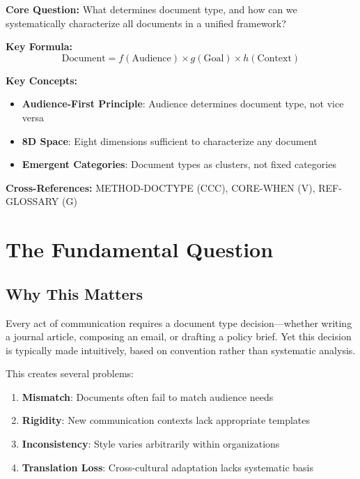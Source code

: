 \begin{tcolorbox}[colback=blue!5!white, colframe=blue!75!black,
    title=Quick Reference: 8D Document Type Theory]

\textbf{Core Question:} What determines document type, and how can we
systematically characterize all documents in a unified framework?

\textbf{Key Formula:}
\begin{equation}
\text{Document} = f(\text{Audience}) \times g(\text{Goal}) \times h(\text{Context})
\end{equation}

\textbf{Key Concepts:}
\begin{itemize}[nosep]
\item \textbf{Audience-First Principle}: Audience determines document type, not vice versa
\item \textbf{8D Space}: Eight dimensions sufficient to characterize any document
\item \textbf{Emergent Categories}: Document types as clusters, not fixed categories
\end{itemize}

\textbf{Cross-References:} METHOD-DOCTYPE (CCC), CORE-WHEN (V), REF-GLOSSARY (G)
\end{tcolorbox}


\section{The Fundamental Question}
\label{sec:doctype-theory-fundamental}

\subsection{Why This Matters}

Every act of communication requires a document type decision---whether writing
a journal article, composing an email, or drafting a policy brief. Yet this
decision is typically made intuitively, based on convention rather than
systematic analysis.

This creates several problems:

\begin{enumerate}
\item \textbf{Mismatch}: Documents often fail to match audience needs
\item \textbf{Rigidity}: New communication contexts lack appropriate templates
\item \textbf{Inconsistency}: Style varies arbitrarily within organizations
\item \textbf{Translation Loss}: Cross-cultural adaptation lacks systematic basis
\end{enumerate}

